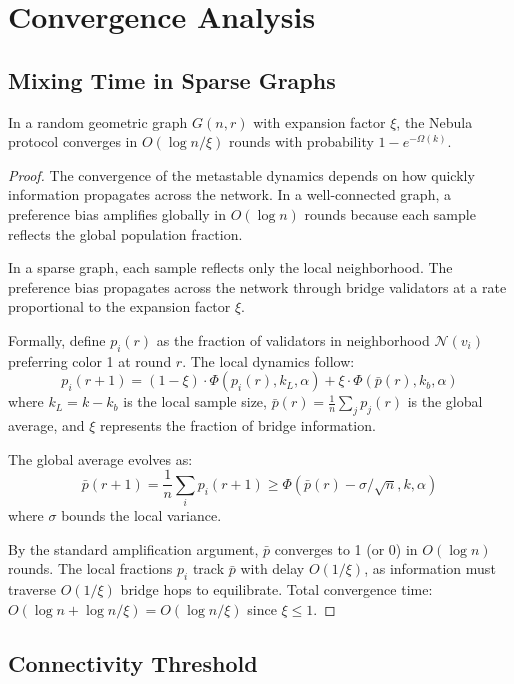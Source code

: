 \section{Convergence Analysis}

\label{sec:nebula-convergence}

\subsection{Mixing Time in Sparse Graphs}

\begin{theorem}
\label{thm:nebula-nebula-convergence}
In a random geometric graph $G(n, r)$ with expansion factor $\xi$, the Nebula protocol
converges in $O(\log n / \xi)$ rounds with probability $1 - e^{-\Omega(k)}$.
\end{theorem}

\begin{proof}
The convergence of the metastable dynamics depends on how quickly information propagates
across the network. In a well-connected graph, a preference bias amplifies globally in
$O(\log n)$ rounds because each sample reflects the global population fraction.

In a sparse graph, each sample reflects only the local neighborhood. The preference
bias propagates across the network through bridge validators at a rate proportional
to the expansion factor $\xi$.

Formally, define $p_i(r)$ as the fraction of validators in neighborhood $\mathcal{N}(v_i)$
preferring color 1 at round $r$. The local dynamics follow:
\[
p_i(r+1) = (1 - \xi) \cdot \Phi(p_i(r), k_L, \alpha) + \xi \cdot \Phi(\bar{p}(r), k_b, \alpha)
\]
where $k_L = k - k_b$ is the local sample size, $\bar{p}(r) = \frac{1}{n}\sum_j p_j(r)$
is the global average, and $\xi$ represents the fraction of bridge information.

The global average evolves as:
\[
\bar{p}(r+1) = \frac{1}{n} \sum_i p_i(r+1) \geq \Phi(\bar{p}(r) - \sigma/\sqrt{n}, k, \alpha)
\]
where $\sigma$ bounds the local variance.

By the standard amplification argument, $\bar{p}$ converges to 1 (or 0) in $O(\log n)$
rounds. The local fractions $p_i$ track $\bar{p}$ with delay $O(1/\xi)$, as information
must traverse $O(1/\xi)$ bridge hops to equilibrate. Total convergence time:
$O(\log n + \log n / \xi) = O(\log n / \xi)$ since $\xi \leq 1$.
\end{proof}

\subsection{Connectivity Threshold}

